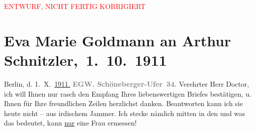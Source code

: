 
\begin{center}
            \textcolor{red}{ENTWURF, NICHT FERTIG KORRIGIERT}
                      \end{center}
            
         
         \renewcommand{\erwaehntePersonen}{Personen: Olga Schnitzler}
         \renewcommand{\erwaehnteInstitutionen}{Institutionen: Lessing-Theater}
         \renewcommand{\erwaehnteOrte}{Orte: Bendlerstraße, Berlin, Schöneberger Ufer, Wien}
         \renewcommand{\erwaehnteWerke}{Werke: Das weite Land. Tragikomödie in fünf Akten}
               \section[ Eva Marie Goldmann an Arthur Schnitzler, 1. 10. 1911]{ Eva Marie Goldmann an Arthur Schnitzler, 1. 10. 1911}\nopagebreak{}\rehead{ }\begin{ledgroupsized}[t]{13cm}\normalsize\beginnumbering \toendnotes[C]{\smallbreak\pagebreak[2]} 
\toendnotes[C]{\smallbreak}\pstart
           \raggedleft{}{\pb}Berlin, d. 1. X. \uline{1911}\uline{.}\pend
           \pstart
           \textcolor{gray}{\textbf{EG}}\hfill \textcolor{gray}{\textbf{W. Schöneberger-Ufer 34.}}\pend
           \pstart{}Verehrter Herr Doctor,\pend\pstart
           ich will Ihnen nur rasch den Empfang Ihres liebenswertigen Briefes bestätigen, u.
               Ihnen für Ihre freundlichen Zeilen herzlichst danken. Beantworten kann ich sie heute nicht – aus irdischem Jammer. {\pb}Ich stecke nämlich mitten in den \label{K_L03541-1v}\label{K_L03541-1h} und was das bedeutet, kann \uline{nur} eine Frau ermessen!\pend
           \pstart

\end{ledgroupsized}
